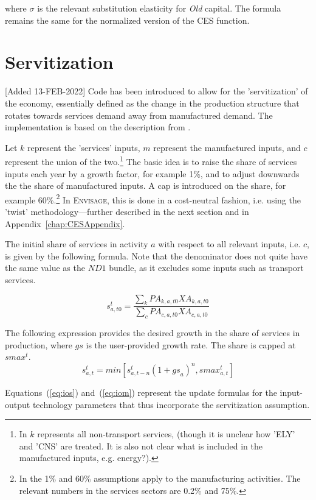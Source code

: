 \documentclass[11pt,letterpaper]{report}
\begin{document}
\noindent where $\sigma$ is the relevant substitution elasticity for \emph{Old} capital. The formula remains the same for the normalized version of the CES
function.

\section{Servitization}

[Added 13-FEB-2022] Code has been introduced to allow for
the 'servitization' of the economy, essentially defined as the change
in the production structure that rotates towards services
demand away from manufactured demand. The implementation
is based on the description from \cite{ChateauetalSupplyJGEA2020}.

Let $k$ represent the 'services' inputs, $m$ represent the
manufactured inputs, and $c$ represent the union of the two.\footnote{In
\cite{ChateauetalSupplyJGEA2020} $k$ represents all non-transport services,
(though it is unclear how 'ELY' and 'CNS' are treated.
It is also not clear what is included in the manufactured inputs, e.g. energy?).}
The basic idea is to raise the
share of services inputs each year by a growth factor, for example
1\%, and to adjust downwards the the share of manufactured
inputs. A cap is introduced on the share, for example 60\%.\footnote{In
\cite{ChateauetalSupplyJGEA2020} the 1\% and 60\% assumptions
apply to the manufacturing activities. The relevant
numbers in the services sectors are 0.2\% and 75\%.}
In \textsc{Envisage}, this is done in a cost-neutral fashion,
i.e. using the 'twist' methodology---further described in the next section
and in Appendix~\ref{chap:CESAppendix}.

The initial share of services in activity $a$
with respect to all relevant inputs, i.e. $c$, is given by the
following formula. Note that the denominator does not quite have the
same value as the $\mathit{ND1}$ bundle, as it excludes some inputs
such as transport services.

\[
s^t_{a,t0} = \displaystyle \frac{\sum_k{\mathit{PA}_{k,a,t0}\mathit{XA}_{k,a,t0}}}
{\sum_c{\mathit{PA}_{c,a,t0}\mathit{XA}_{c,a,t0}}}
\]

The following expression provides the desired growth in the share of
services in production, where $\mathit{gs}$ is the user-provided growth
rate. The share is capped at $\mathit{smax}^t$.
\[
s^t_{a,t} = min\left[s^t_{a,t-n} \left(1 + \mathit{gs}_{a} \right)^n, \mathit{smax}^t_{a,t}\right]
\]

Equations~(\ref{eq:ios}) and~(\ref{eq:iom}) represent the update formulas for
the input-output technology parameters that thus incorporate
the servitization assumption.
\end{document}
